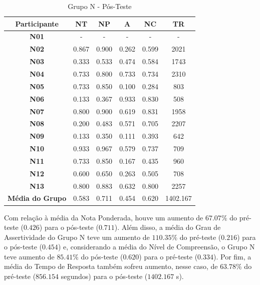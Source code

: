 \begin{table}[htbp]
	\centering
	\caption{Grupo N - Pós-Teste}		
	\begin{tabular}{|c|c|c|c|c|c|}
		\hline
		\rowcolor[HTML]{C0C0C0} 
		\textbf{Participante} & \textbf{NT} & \textbf{NP} & \textbf{A} & \textbf{NC} & \textbf{TR} \\ \hline
		\textbf{N01} & - & - & - & - & - \\ \hline
		\rowcolor[HTML]{EFEFEF} 
		\textbf{N02} & 0.867 & 0.900 & 0.262 & 0.599 & 2021 \\ \hline
		\textbf{N03} & 0.333 & 0.533 & 0.474 & 0.584 & 1743 \\ \hline
		\rowcolor[HTML]{EFEFEF} 
		\textbf{N04} & 0.733 & 0.800 & 0.733 & 0.734 & 2310 \\ \hline
		\textbf{N05} & 0.733 & 0.850 & 0.100 & 0.284 & 803 \\ \hline
		\rowcolor[HTML]{EFEFEF} 
		\textbf{N06} & 0.133 & 0.367 & 0.933 & 0.830 & 508 \\ \hline
		\textbf{N07} & 0.800 & 0.900 & 0.619 & 0.831 & 1958 \\ \hline
		\rowcolor[HTML]{EFEFEF} 
		\textbf{N08} & 0.200 & 0.483 & 0.571 & 0.705 & 2207 \\ \hline
		\textbf{N09} & 0.133 & 0.350 & 0.111 & 0.393 & 642 \\ \hline
		\rowcolor[HTML]{EFEFEF} 
		\textbf{N10} & 0.933 & 0.967 & 0.579 & 0.737 & 709 \\ \hline
		\textbf{N11} & 0.733 & 0.850 & 0.167 & 0.435 & 960 \\ \hline
		\rowcolor[HTML]{EFEFEF} 
		\textbf{N12} & 0.600 & 0.650 & 0.263 & 0.505 & 708 \\ \hline
		\textbf{N13} & 0.800 & 0.883 & 0.632 & 0.800 & 2257 \\ \hline
		\rowcolor[HTML]{EFEFEF} 
		\textbf{Média do Grupo} & 0.583 & 0.711 & 0.454 & 0.620 & 1402.167 \\ \hline
	\end{tabular}
	\label{tab:F1_H02-posteste}
\end{table}

Com relação à média da Nota Ponderada, houve um aumento de $67.07\%$ do pré-teste ($0.426$) para o pós-teste ($0.711$). Além disso, a média do Grau de Assertividade do Grupo N teve um aumento de $110.35\%$ do pré-teste ($0.216$) para o pós-teste ($0.454$) e, considerando a média do Nível de Compreensão, o Grupo N teve aumento de $85.41\%$ do pós-teste ($0.620$) para o pré-teste ($0.334$). Por fim, a média do Tempo de Resposta também sofreu aumento, nesse caso, de $63.78\%$ do pré-teste ($856.154$ segundos) para o pós-teste ($1402.167$ s).

